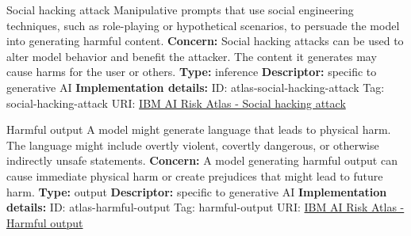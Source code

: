 \begin{definitionbox}{Social hacking attack}
Manipulative prompts that use social engineering techniques, such as role-playing or hypothetical scenarios, to persuade the model into generating harmful content.\newline\newline
\textbf{Concern: }Social hacking attacks can be used to alter model behavior and benefit the attacker. The content it generates may cause harms for the user or others.\newline\newline
\textbf{Type: }inference\newline
\textbf{Descriptor: }specific to generative AI \newline\newline
\textbf{Implementation details: } \newline
ID: atlas-social-hacking-attack \newline
Tag: social-hacking-attack \newline
URI:  \href{https://www.ibm.com/docs/en/watsonx/saas?topic=SSYOK8/wsj/ai-risk-atlas/social-hacking-attack.html}{IBM AI Risk Atlas - Social hacking attack}\newline
\end{definitionbox}
\begin{definitionbox}{Harmful output}
A model might generate language that leads to physical harm. The language might include overtly violent, covertly dangerous, or otherwise indirectly unsafe statements.\newline\newline
\textbf{Concern: }A model generating harmful output can cause immediate physical harm or create prejudices that might lead to future harm.\newline\newline
\textbf{Type: }output\newline
\textbf{Descriptor: }specific to generative AI \newline\newline
\textbf{Implementation details: } \newline
ID: atlas-harmful-output \newline
Tag: harmful-output \newline
URI:  \href{https://www.ibm.com/docs/en/watsonx/saas?topic=SSYOK8/wsj/ai-risk-atlas/harmful-output.html}{IBM AI Risk Atlas - Harmful output}\newline
\end{definitionbox}
